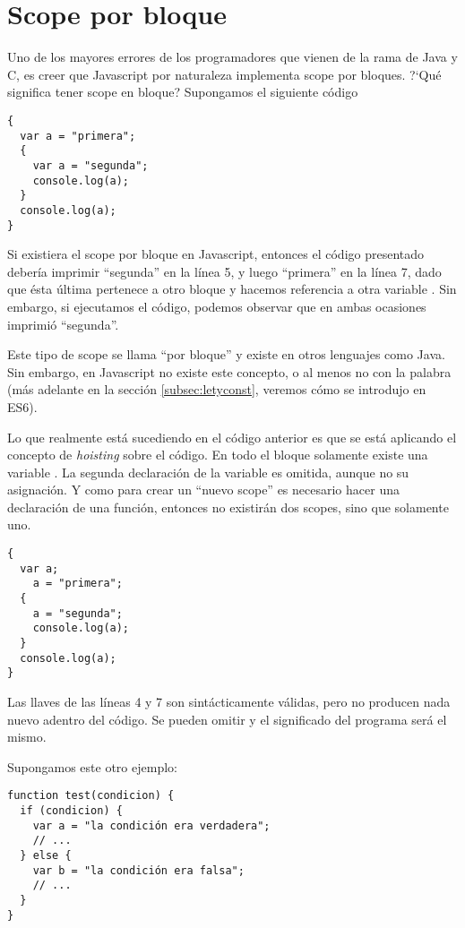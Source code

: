 \section{Scope por bloque}
\label{sec:scopebloque}

Uno de los mayores errores de los programadores que vienen de la rama de Java y C, es creer que Javascript por naturaleza implementa scope por bloques. ?`Qué significa tener scope en bloque? Supongamos el siguiente código

\begin{lstlisting}
{
  var a = "primera";
  {
    var a = "segunda";
    console.log(a);
  }
  console.log(a);
}
\end{lstlisting}

Si existiera el scope por bloque en Javascript, entonces el código presentado debería imprimir "`segunda"' en la línea 5, y luego "`primera"' en la línea 7, dado que ésta última pertenece a otro bloque y hacemos referencia a otra variable . Sin embargo, si ejecutamos el código, podemos observar que en ambas ocasiones imprimió "`segunda"'.

Este tipo de scope se llama "`por bloque"' y existe en otros lenguajes como Java. Sin embargo, en Javascript no existe este concepto, o al menos no con la palabra  (más adelante en la sección \ref{subsec:letyconst}, veremos cómo se introdujo en ES6).

Lo que realmente está sucediendo en el código anterior es que se está aplicando el concepto de \textit{hoisting} sobre el código. En todo el bloque solamente existe una variable . La segunda declaración de la variable es omitida, aunque no su asignación. Y como para crear un "`nuevo scope"' es necesario hacer una declaración de una función, entonces no existirán dos scopes, sino que solamente uno.

\begin{lstlisting}
{
  var a;
	a = "primera";
  {
    a = "segunda";
    console.log(a);
  }
  console.log(a);
}
\end{lstlisting}

Las llaves \code{\{\}} de las líneas 4 y 7 son sintácticamente válidas, pero no producen nada nuevo adentro del código. Se pueden omitir y el significado del programa será el mismo.

Supongamos este otro ejemplo:

\begin{lstlisting}
function test(condicion) {
  if (condicion) {
    var a = "la condición era verdadera";
    // ...
  } else {
    var b = "la condición era falsa";
    // ...
  }
}
\end{lstlisting}

